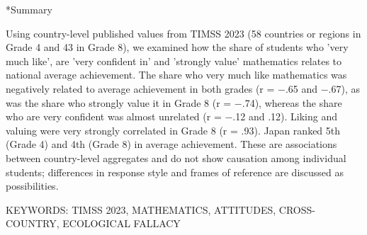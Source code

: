 \documentclass[a4paper,10pt,twocolumn]{ltjsarticle}
\makeatletter
\renewcommand{\section}{\@startsection{section}{1}{\z@}{1.1\Cvs \@plus.4\Cdp \@minus.2\Cdp}{.5\Cvs \@plus.2\Cdp}{\normalfont\gtfamily\bfseries\large}}
\makeatother
\begin{document}
\section*{Summary}
{\footnotesize\setlength{\parindent}{0pt}Using country-level published values from TIMSS 2023 (58 countries or regions in Grade 4 and 43 in Grade 8), we examined how the share of students who 'very much like', are 'very confident in' and 'strongly value' mathematics relates to national average achievement. The share who very much like mathematics was negatively related to average achievement in both grades (r = −.65 and −.67), as was the share who strongly value it in Grade 8 (r = −.74), whereas the share who are very confident was almost unrelated (r = −.12 and .12). Liking and valuing were very strongly correlated in Grade 8 (r = .93). Japan ranked 5th (Grade 4) and 4th (Grade 8) in average achievement. These are associations between country-level aggregates and do not show causation among individual students; differences in response style and frames of reference are discussed as possibilities.\par\smallskip KEYWORDS: TIMSS 2023, MATHEMATICS, ATTITUDES, CROSS-COUNTRY, ECOLOGICAL FALLACY\par}
\medskip\noindent{}
\end{document}
